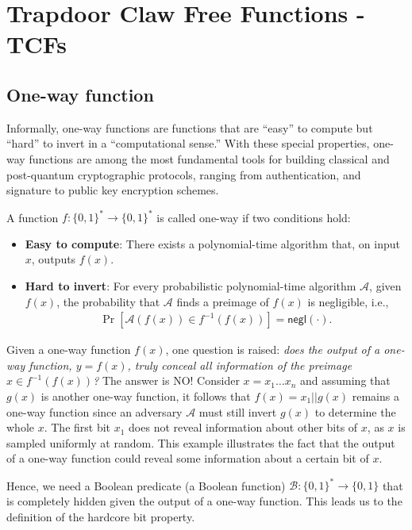 \section{Trapdoor Claw Free Functions - TCFs} \label{tfcs}

\subsection{One-way function}
Informally, one-way functions are functions that are ``easy'' to compute but ``hard'' to invert in a ``computational sense.'' With these special properties, one-way functions are among the most fundamental tools for building classical and post-quantum cryptographic protocols, ranging from authentication, and signature to public key encryption schemes. 

\begin{defn}
    A function $f:\{0,1\}^* \to \{0,1\}^*$ is called one-way if two conditions hold:
    \begin{itemize}
        \item \textbf{Easy to compute}: There exists a polynomial-time algorithm that, on input $x$, outputs $f(x)$.
        \item \textbf{Hard to invert}: For every probabilistic polynomial-time algorithm $\mathcal{A}$, given $f(x)$, the probability that $\mathcal{A}$ finds a preimage of $f(x)$ is negligible, i.e.,
        \begin{align}
            \Pr[\mathcal{A}(f(x)) \in f^{-1}(f(x))] = \mathsf{negl}(\cdot).
        \end{align}
    \end{itemize}
\end{defn}

\noindent Given a one-way function $f(x)$, one question is raised: \textit{does the output of a one-way function, $y=f(x)$, truly conceal all information of the preimage $x\in f^{-1}(f(x))$?} The answer is NO! 
Consider $x=x_1\dots x_n$ and assuming that $g(x)$ is another one-way function, it follows that $f(x) = x_1||g(x)$ remains a one-way function since an adversary $\mathcal{A}$ must still invert $g(x)$ to determine the whole $x$. The first bit $x_1$ does not reveal information about other bits of $x$, as $x$ is sampled uniformly at random. This example illustrates the fact that the output of a one-way function could reveal some information about a certain bit of $x$.

Hence, we need a Boolean predicate (a Boolean function) $\mathcal{B}:\{0,1\}^*\to\{0,1\}$ that is completely hidden given the output of a one-way function. This leads us to the definition of the hardcore bit property.

